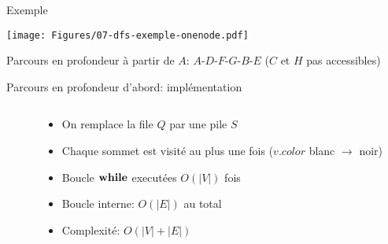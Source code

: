\begin{frame}{Exemple}

\centerline{\texttt{[image: Figures/07-dfs-exemple-onenode.pdf]}}

\bigskip

Parcours en profondeur à partir de $A$: $A$-$D$-$F$-$G$-$B$-$E$ ($C$ et $H$ pas accessibles)

\end{frame}

\begin{frame}{Parcours en profondeur d'abord: implémentation}

\begin{columns}
\begin{column}{5cm}
\begin{center}
{\small\vspace{-0.3cm}
}
\end{center}
\end{column}
\begin{column}{5cm}
\begin{itemize}
\item On remplace la file $Q$ par une pile $S$
\item Chaque sommet est visité au plus une fois ($v.color$ blanc
  $\rightarrow$ noir)
\item Boucle $\textbf{while}$ executées $O(|V|)$ fois
\item Boucle interne: $O(|E|)$ \alert{au total}
\item Complexité: $O(|V|+|E|)$
\end{itemize}
\end{column}
\end{columns}

\end{frame}

